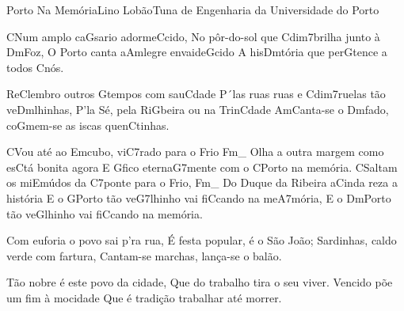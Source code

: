 \begin{musica}{Porto Na Memória}{Lino Lobão}{Tuna de Engenharia da Universidade do Porto}

\ac{C}{Num} amplo ca\ac{G}{sa}rio adorme\ac{C}{ci}do,
No pôr-do-sol que \ac{Cdim7}{bri}lha junto à \ac{Dm}{Foz},
O Porto canta a\ac{Am}{le}gre envaide\ac{G}{ci}do
A his\ac{Dm}{tó}ria que per\ac{G}{ten}ce a todos \ac{C}{nós}.

Re\ac{C}{lem}bro outros \ac{G}{tem}pos com sau\ac{C}{da}de
P´las ruas ruas e \ac{Cdim7}{rue}las tão ve\ac{Dm}{lhi}nhas,
P’la Sé, pela Ri\ac{G}{bei}ra ou na Trin\ac{C}{da}de
\ac{Am}{Can}ta-se o \ac{Dm}{fa}do, co\ac{G}{mem}-se as iscas quen\ac{C}{ti}nhas.

\ac{C}{Vou} até ao \ac{Em}{cu}bo, vi\ac{C7}{ra}do para o \ac{F}{rio}
\ac{Fm}{}_ Olha a outra margem como es\ac{C}{tá} bonita agora
E \ac{G}{fi}co eterna\ac{G7}{men}te com o \ac{C}{Por}to na memória.
\ac{C}{Sal}tam os mi\ac{Em}{ú}dos da \ac{C7}{pon}te para o \ac{F}{rio},
\ac{Fm}{}_ Do Duque da Ribeira a\ac{C}{in}da reza a história
E o \ac{G}{Por}to tão ve\ac{G7}{lhi}nho vai fi\ac{C}{can}do na me\ac{A7}{mó}ria,
E o \ac{Dm}{Por}to tão ve\ac{G}{lhi}nho vai fi\ac{C}{can}do na memória.

Com euforia o povo sai p’ra rua,
É festa popular, é o São João;
Sardinhas, caldo verde com fartura,
Cantam-se marchas, lança-se o balão.

Tão nobre é este povo da cidade,
Que do trabalho tira o seu viver.
Vencido põe um fim à mocidade
Que é tradição trabalhar até morrer.


\end{musica}
